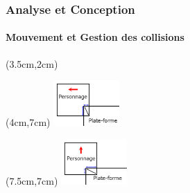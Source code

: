 \begin{frame}

	\frametitle{Analyse et Conception}
	\framesubtitle{Mouvement et Gestion des collisions}

	\begin{textblock*}{7cm}(3.5cm,2cm)
	\end{textblock*}

	\begin{textblock*}{3cm}(4cm,7cm)
		\includegraphics[width=2.5cm]{figures/collision_decalGauche.jpg}
	\end{textblock*}

	\begin{textblock*}{3cm}(7.5cm,7cm)
		\includegraphics[width=2.5cm]{figures/collision_decalHaut.jpg}
	\end{textblock*}

\end{frame}